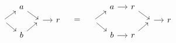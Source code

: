 \begin{equation*}
\begin{tikzcd}[row sep=tiny, column sep=small]
& a \arrow{dr} & & \\
\! \arrow{ur} \arrow{dr} & & \! \arrow{r} & r \\
& b \arrow{ur} & &
\end{tikzcd}
\quad = \quad
\begin{tikzcd}[row sep=tiny, column sep=small]
& a \arrow{r} & r \arrow{dr} & & \\
\! \arrow{ur} \arrow{dr} & & & \! \arrow{r} & r \\
& b \arrow{r} & r \arrow{ur} & &
\end{tikzcd}
\end{equation*}
